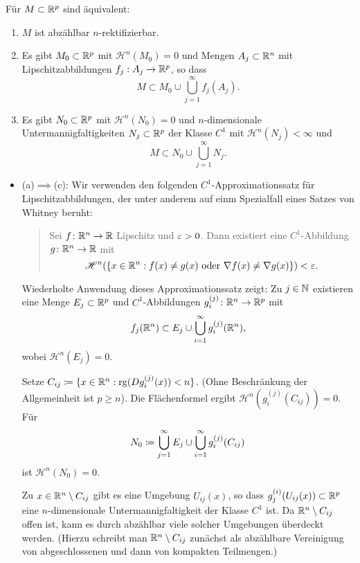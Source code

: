 \documentclass[a4paper,twoside,DIV15,BCOR12mm]{scrbook}
\newcommand{\HM}{\mathscr H}
\begin{document}
\begin{proposition}
Für $M\subset \mathbb{R}^p$ sind äquivalent:
\begin{enumerate}[\quad(a)]
\item $M$ ist abzählbar $n$-rektifizierbar.
\item Es gibt $M_0\subset \mathbb{R}^p$ mit $\HM^n(M_0)=0$ und Mengen $A_j\subset \mathbb{R}^n$ mit Lipschitzabbildungen $f_j:A_j \to \mathbb{R}^p$, so dass 
\[
M\subset M_0 \cup \bigcup_{j=1}^\infty f_j(A_j).
\]
\item Es gibt $N_0\subset \mathbb{R}^p$ mit $\HM^n(N_0)=0$ und $n$-dimensionale Untermannigfaltigkeiten $N_j\subset \mathbb{R}^p$ der Klasse $C^1$ mit $\HM^n(N_j)<\infty$ und 
\[
M\subset N_0 \cup \bigcup_{j=1}^\infty N_j.
\]
\end{enumerate}
\end{proposition}

\begin{beweis}
\begin{itemize}
\item (a)$\implies$(c): Wir verwenden den folgenden $C^1$-Approximationssatz für Lipschitzabbildungen, der 
unter anderem auf einm Spezialfall eines Satzes von Whitney beruht:

\begin{quotation}
\noindent Sei $f\colon\mathbb{R}^n \to \mathbb{R}$ Lipschitz und $\varepsilon>0$. Dann existiert eine $C^1$-Abbildung $g\colon\mathbb{R}^n\to \mathbb{R}$ mit
\[
\HM^n(\{x\in \MdR^n: f(x) \ne g(x) \text{ oder } \nabla f(x) \ne \nabla g(x)\})<\ep.
\]
\end{quotation}

Wiederholte Anwendung dieses Approximationssatz zeigt: Zu $j\in\mathbb{N}$ existieren eine Menge $E_j\subset \mathbb{R}^p$ und $C^1$-Abbildungen $g_i^{(j)}\colon \mathbb{R}^n\to \mathbb{R}^p$ mit
\[
f_j(\mathbb{R}^n) \subset E_j \cup \bigcup_{i=1}^\infty g_i^{(j)} (\mathbb{R}^n),
\]
wobei $\HM^n(E_j)=0$.

Setze $C_{ij}\da \{x\in \MdR^n : \operatorname{rg}(Dg_i^{(j)} (x)) < n \}$. (Ohne Beschränkung der Allgemeinheit ist $p\ge n$). Die Flächenformel ergibt $\HM^n(g_i^{(j)}(C_{ij})) = 0$. Für 
$$N_0 \da \bigcup_{j=1}^\infty E_j \cup \bigcup_{i=1}^\infty g_i^{(j)}(C_{ij})$$ 
ist $\HM^n(N_0)=0$.

Zu $x\in \mathbb{R}^n\setminus C_{ij}$ gibt es eine Umgebung $U_{ij}(x)$, so dass $g_j^{(i)}(U_{ij}(x))\subset \mathbb{R}^p$ eine $n$-dimensionale Untermannigfaltigkeit der Klasse $C^1$ ist. Da $\mathbb{R}^n\setminus C_{ij}$ offen ist, kann es durch abzählbar viele solcher Umgebungen überdeckt werden. (Hierzu schreibt man $\mathbb{R}^n\setminus C_{ij}$ 
zunächst als abzählbare Vereinigung von abgeschlossenen und dann von kompakten Teilmengen.)
\end{itemize}
\end{beweis}
\end{document}
